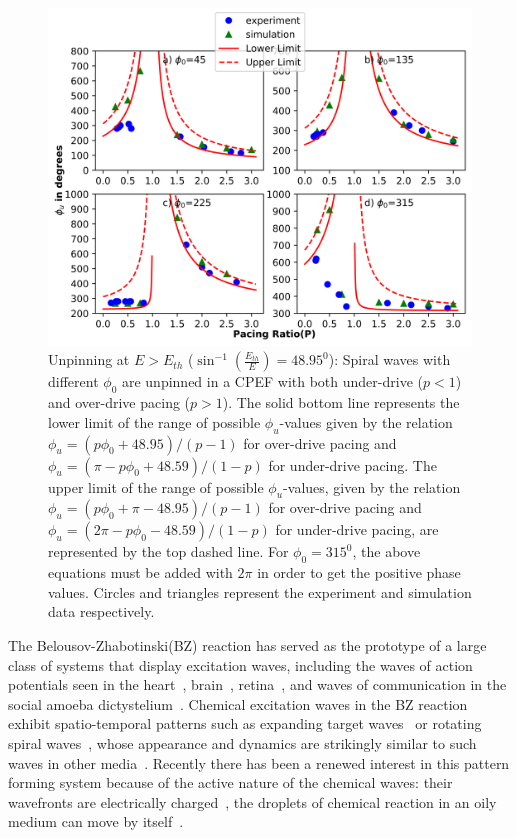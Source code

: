 \documentclass[%
 reprint,
 amsmath,amssymb,
 aps,
prb,
]{revtex4-2}
\begin{document}
\begin{figure}[htb!]
    \centering
    \includegraphics{E>Eth.png}
    \caption{Unpinning at $E>E_{th}$ 
    (${\sin^{-1}}{(\frac{E_{th}}{E})}=48.95^0$): Spiral waves with different
	${\phi}_0$ are unpinned in a CPEF with both under-drive ($p<1$) and
	over-drive pacing ($p>1$). The solid bottom line represents the lower
	limit of the range of possible ${\phi}_u$-values given by the relation
	${\phi}_u=(p{\phi}_0+48.95)/(p-1)$ for over-drive pacing and
	${\phi}_u=(\pi-p{\phi}_0+48.59)/(1-p)$ for under-drive pacing. The
	upper limit of the range of possible ${\phi}_u$-values, given by the
	relation ${\phi}_u=(p{\phi}_0+\pi-48.95)/(p-1)$ for over-drive pacing
	and ${\phi}_u=(2\pi-p{\phi}_0-48.59)/(1-p)$ for under-drive pacing, are
	represented by the top dashed line. For ${\phi}_0 = 315^0$, the above
	equations must be added with $2\pi$ in order to get the positive phase
	values.
    Circles and triangles represent the experiment and simulation data
	respectively.  }
    \label{fig:unpinning_E>Eth}
\end{figure}

The Belousov-Zhabotinski(BZ) reaction has served as the prototype of a large
class of systems that display excitation waves, including the waves of action
potentials seen in the heart~\cite{Luther2011}, brain~\cite{Huang2004}, retina~\cite{???},
and waves of communication in the social amoeba dictystelium~\cite{???}.  
Chemical excitation waves in the BZ reaction exhibit spatio-temporal 
patterns such as expanding target waves~\cite{zhang2019stability} or rotating spiral
waves~\cite{zykov2018spiral}, whose appearance and dynamics are strikingly
similar to such waves in other media~\cite{sinha2014patterns}.  Recently there
has been a renewed interest in this pattern forming system because of the
active nature of the chemical waves: their wavefronts are electrically
charged~\cite{Amrutha,steinbock1992electric}, the droplets of chemical reaction in an oily medium
can move by itself~\cite{jin2017chemotaxis, ryabchun2022run}.
\end{document}
